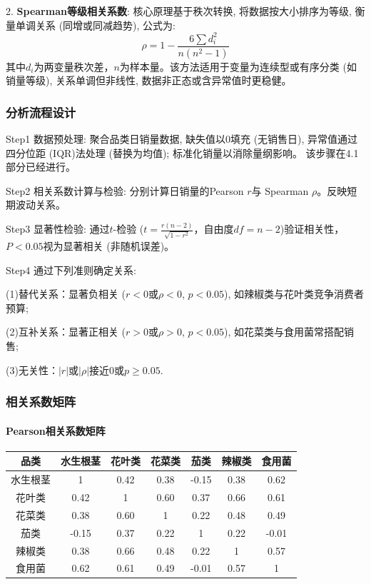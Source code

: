 \documentclass{cumcmthesis}
\begin{document}

2. \textbf{Spearman等级相关系数}:   
核心原理基于秩次转换, 将数据按大小排序为等级, 衡量单调关系 (同增或同减趋势), 公式为: 
\begin{equation}
\rho=1-\frac{6\sum d_i^2}{n(n^2-1)}
\end{equation}  
其中$d_i$为两变量秩次差，$n$为样本量。该方法适用于变量为连续型或有序分类
 (如销量等级), 关系单调但非线性, 数据非正态或含异常值时更稳健。

\subsubsection{分析流程设计}
    Step1 数据预处理: 聚合品类日销量数据, 缺失值以0填充 (无销售日), 
    异常值通过四分位距 (IQR)法处理 (替换为均值); 标准化销量以消除量纲影响。
    该步骤在4.1部分已经进行。
   
    Step2 相关系数计算与检验: 分别计算日销量的Pearson $r$与
    Spearman $\rho$。反映短期波动关系。 
    
    Step3 显著性检验: 通过$t$-检验 
    ($t=\frac{r(n-2)}{\sqrt{1-r^2}}$，自由度$df=n-2$)验证相关性，
    $P<0.05$视为显著相关 (非随机误差)。
    
    Step4 通过下列准则确定关系: 
   
    (1)替代关系：显著负相关 ($r<0$或$\rho<0$, $p<0.05$), 如辣椒类与花叶类竞争消费者预算; 

    (2)互补关系：显著正相关 ($r>0$或$\rho>0$, $p<0.05$), 如花菜类与食用菌常搭配销售;  

    (3)无关性：$|r|$或$|\rho|$接近0或$p≥0.05$.


\subsubsection{相关系数矩阵} 
\paragraph{Pearson相关系数矩阵}
\begin{table}[H]
\centering
\begin{tabular}{c c c c c c c}
\toprule
品类 & 水生根茎 & 花叶类 & 花菜类 & 茄类 & 辣椒类 & 食用菌 \\
\midrule
水生根茎 & 1 & 0.42 & 0.38 & -0.15 & 0.38 & 0.62 \\
花叶类 & 0.42 & 1 & 0.60 & 0.37 & 0.66 & 0.61 \\
花菜类 & 0.38 & 0.60 & 1 & 0.22 & 0.48 & 0.49 \\
茄类 & -0.15 & 0.37 & 0.22 & 1 & 0.22 & -0.01 \\
辣椒类 & 0.38 & 0.66 & 0.48 & 0.22 & 1 & 0.57 \\
食用菌 & 0.62 & 0.61 & 0.49 & -0.01 & 0.57 & 1 \\
\bottomrule
\end{tabular}
\end{table}
\end{document}
